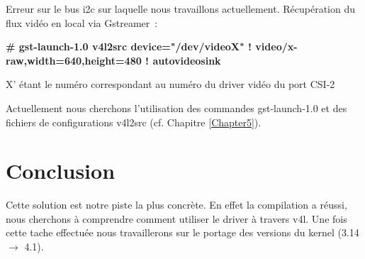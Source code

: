 Erreur sur le bus i2c sur laquelle nous travaillons actuellement.
Récupération du flux vidéo en local via Gstreamer :

\textbf{\# gst-launch-1.0 v4l2src device="/dev/videoX" ! video/x-raw,width=640,height=480 ! autovideosink}

X’ étant le numéro correspondant au numéro du driver vidéo du port CSI-2

Actuellement nous cherchons l’utilisation des commandes gst-launch-1.0 et des
fichiers de configurations v4l2src (cf. Chapitre \ref{Chapter5}).

\section{Conclusion}

Cette solution est notre piste la plus concrète. En effet la compilation a réussi,
nous cherchons à comprendre comment utiliser le driver à travers v4l. Une fois cette
tache effectuée nous travaillerons sur le portage des versions du kernel (3.14 $\rightarrow$ 4.1).

